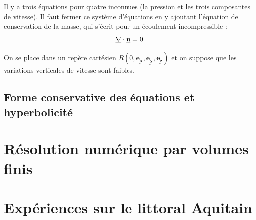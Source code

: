 \documentclass[
a4paper,
11pt,
titlepage,
]{article}
\renewcommand{\vec}[1]{\mathbf{\underline{#1}}}
\begin{document}
Il y a trois équations pour quatre inconnues (la pression et les trois composantes de vitesse). Il faut fermer ce système d'équations en y ajoutant l'équation de conservation de la masse, qui s'écrit pour un écoulement incompressible :
\begin{equation}
\label{eq:masscons}
\vec{\nabla}\cdot\vec{u} = 0\\	
\end{equation}

On se place dans un repère cartésien $R(0,\vec{e_x},\vec{e_y},\vec{e_z})$ et on suppose que les variations verticales de vitesse sont faibles.
\subsection{Forme conservative des équations et hyperbolicité}

\section{Résolution numérique par volumes finis}

\section{Expériences sur le littoral Aquitain}

\newpage
\label{myLastPage}

\newpage
  
\printbibliography
{}
\end{document}
